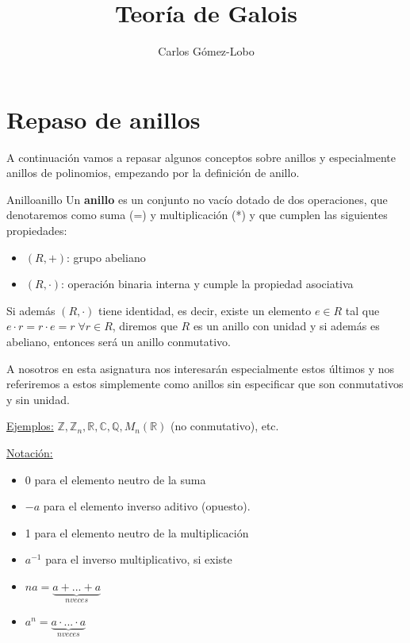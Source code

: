 \documentclass[10pt, a4paper]{article}
\newcommand{\R}{\mathbb{R}}
\newcommand{\Z}{\mathbb{Z}}
\newcommand{\C}{\mathbb{C}}
\newcommand{\Q}{\mathbb{Q}}
\begin{document}
\title{Teoría de Galois}
\author{Carlos Gómez-Lobo}
\date{}
\maketitle

\section{Repaso de anillos}

A continuación vamos a repasar algunos conceptos sobre anillos y especialmente anillos de polinomios, empezando por la definición de anillo.

\begin{definition}{Anillo}{anillo}
Un \textbf{anillo} es un conjunto no vacío dotado de dos operaciones, que denotaremos como suma (=) y multiplicación (*) y que cumplen las siguientes propiedades:
\begin{itemize}
	\item $(R, +)$: grupo abeliano
	\item $(R, \cdot)$: operación binaria interna y cumple la propiedad asociativa
\end{itemize}
Si además $(R, \cdot)$ tiene identidad, es decir, existe un elemento $e \in R$ tal que $e \cdot r = r \cdot e = r \; \forall r \in R$, diremos que $R$ es un anillo con unidad y si además es abeliano, entonces será un anillo conmutativo.
\end{definition}

A nosotros en esta asignatura nos interesarán especialmente estos últimos y nos referiremos a estos simplemente como anillos sin especificar que son conmutativos y sin unidad.

\vspace{3mm}

\underline{Ejemplos:} $\Z, \Z_n, \R, \C, \Q, M_n(\R)$ (no conmutativo), etc.

\vspace{3mm}

\underline{Notación:} \begin{itemize}
	\item 0 para el elemento neutro de la suma
	\item $-a$ para el elemento inverso aditivo (opuesto).
	\item 1 para el elemento neutro de la multiplicación
	\item $a^{-1}$ para el inverso multiplicativo, si existe
	\item $na = \underbrace{a + ... + a}_{n veces}$
	
	\vspace{-3mm}
	
	\item $a^n = \underbrace{a \cdot ... \cdot a}_{n veces}$
\end{itemize}
\end{document}

